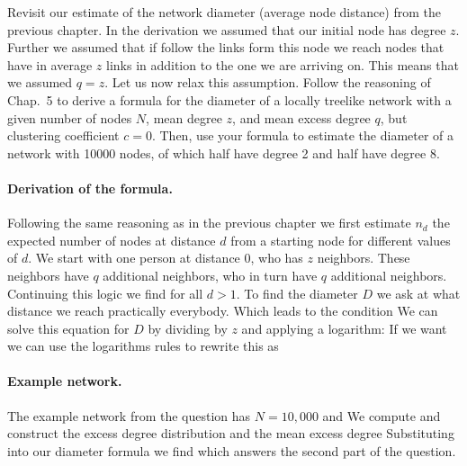 Revisit our estimate of the network diameter (average node distance) from the previous chapter. In the derivation we assumed that our initial node has degree $z$. Further we assumed that if follow the links form this node we reach nodes that have in average $z$ links in addition to the one we are arriving on. This means that we assumed $q=z$. Let us now relax this assumption. Follow the reasoning of Chap.~5 to derive a formula for the diameter of a locally treelike network with a given number of nodes $N$, mean degree $z$, and mean excess degree $q$, but clustering coefficient $c=0$. Then, use your formula to estimate the diameter of a network with 10000 nodes, of which half have degree 2 and half have degree 8. 

\solution
\paragraph{Derivation of the formula.}Following the same reasoning as in the previous chapter we first estimate $n_d$ the expected number of nodes at distance $d$ from a starting node for different values of $d$.
We start with one person at distance 0, who has $z$ neighbors. These neighbors have $q$ additional neighbors, who in turn have $q$ additional neighbors. Continuing this logic we find
for all $d>1$. To find the diameter $D$ we ask at what distance we reach practically everybody. Which leads to the condition
We can solve this equation for $D$ by dividing by $z$ and applying a logarithm:
If we want we can use the logarithms rules to rewrite this as 

\paragraph{Example network.}The example network from the question has $N=10,000$ and 
We compute
and construct the excess degree distribution
and the mean excess degree
Substituting into our diameter formula we find 
which answers the second part of the question. 

